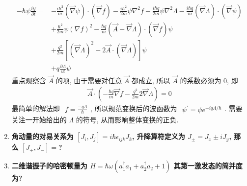 \documentclass[../../main.tex]{subfiles}
\begin{document}
\begin{enumerate}
{{\begin{align*}
  \end{align*}
  \begin{align*}
    -\hbar\psi\frac{\partial f}{\partial t} = &-\frac{i\hbar^{2}}{m}(\vec{\nabla}\psi)\cdot(\vec{\nabla}f)  - \frac{i\hbar^{2}}{2m}\psi\nabla^{2}f - \frac{i\hbar q}{2m}\psi\nabla^{2}\Lambda - \frac{i\hbar q}{m}(\vec{\nabla}\Lambda)\cdot(\vec{\nabla}\psi) \\
    & + \frac{\hbar^{2}}{2m}\psi(\nabla f)^{2} -\frac{\hbar q}{m}(\vec{A}-\vec{\nabla}\Lambda)\cdot(\vec{\nabla}f)\psi\\
    &  + \frac{q^{2}}{2m}\left[(\vec{\nabla}\Lambda)^{2} - 2\vec{A}\cdot(\vec{\nabla}\Lambda)\right]\psi\\
    &+ q\frac{\partial\Lambda}{\partial t}\psi
  \end{align*}
  重点观察含 $\vec{A}$ 的项, 由于需要对任意 $\vec{A}$ 都成立, 所以 $\vec{A}$ 的系数必须为 $0$, 即
  \begin{align*}
    \vec{A}\cdot\left(-\frac{\hbar q}{m}\vec{\nabla}f - \frac{q^{2}}{2m}2\vec{\nabla}\Lambda\right) = 0
  \end{align*}
  最简单的解法即 $\begin{aligned}
    f = \frac{-q\Lambda}{\hbar}
  \end{aligned}$, 所以规范变换后的波函数为 $\begin{aligned}
    \psi^{\prime} = \boxed{\psi e^{-iq\Lambda/\hbar}}
  \end{aligned}$. 需要关注一开始给出的 $\Lambda$ 的符号, 从而影响整体变换的正负.}}
  
  \item \textbf{角动量的对易关系为 $[J_{i}, J_{j}] = i\hbar\epsilon_{ijk}J_{k}$, 升降算符定义为 $J_{\pm} = J_{x}\pm iJ_{y}$, 那么 $[J_{+}, J_{-}] = $?}
  
{}
  
  \item \textbf{二维谐振子的哈密顿量为 $H = \hbar\omega\left(a_{1}^{\dagger}a_{1} + a_{2}^{\dagger}a_{2} + 1\right)$ 其第一激发态的简并度为?}
  
{}
  

\end{enumerate}
\end{document}
